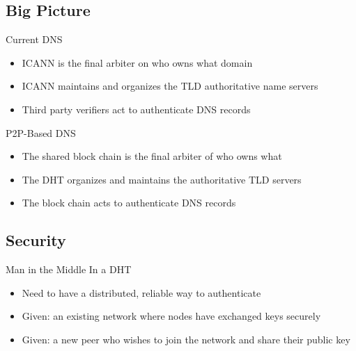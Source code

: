 \documentclass[11pt]{beamer}
\begin{document}
\subsection{Big Picture}

\begin{frame}{Current DNS}

	\begin{itemize}
		\item ICANN is the final arbiter on who owns what domain
		\item ICANN maintains and organizes the TLD authoritative name servers
		\item Third party verifiers act to authenticate DNS records
	
	\end{itemize}


\end{frame}



\begin{frame}{P2P-Based DNS}

	\begin{itemize}
		\item The shared block chain is the final arbiter of who owns what
		\item The DHT organizes and maintains the authoritative TLD servers
		\item The block chain acts to authenticate DNS records
	\end{itemize}
\end{frame}

\subsection{Security}

\begin{frame}{Man in the Middle In a DHT}

	\begin{itemize}
		\item Need to have a distributed, reliable way to authenticate 
		\item  Given: an existing network where nodes have exchanged keys securely
		\item  Given: a new peer who wishes to join the network and share their public key
	
	\end{itemize}


\end{frame}
\end{document}
